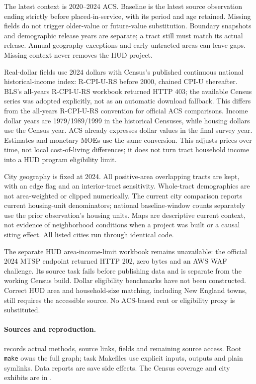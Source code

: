 \documentclass[11pt]{article}
\begin{document}
The latest context is 2020--2024 ACS. Baseline is the latest source observation
ending strictly before placed-in-service, with its period and age retained. Missing
fields do not trigger older-value or future-value substitution. Boundary snapshots
and demographic release years are separate; a tract still must match its actual
release. Annual geography exceptions and early untracted areas can leave gaps.
Missing context never removes the HUD project.

Real-dollar fields use 2024 dollars with Census's published continuous national
historical-income index: R-CPI-U-RS before 2000, chained CPI-U thereafter. BLS's
all-years R-CPI-U-RS workbook returned HTTP 403; the available Census series was
adopted explicitly, not as an automatic download fallback. This differs from the
all-years R-CPI-U-RS convention for official ACS comparisons. Income dollar years
are 1979/1989/1999 in the historical Censuses, while housing dollars use the Census
year. ACS already expresses dollar values in the final survey year. Estimates and
monetary MOEs use the same conversion. This adjusts prices over time, not local
cost-of-living differences; it does not turn tract household income into a HUD
program eligibility limit.

\clearpage


City geography is fixed at 2024. All positive-area overlapping tracts are kept,
with an edge flag and an interior-tract sensitivity. Whole-tract demographics are
not area-weighted or clipped numerically. The current city comparison reports
current housing-unit denominators; national baseline-window counts separately
use the prior observation's housing units. Maps are descriptive current context,
not evidence of neighborhood conditions when a project was built or a causal
siting effect. All listed cities run through identical code.

The separate HUD area-income-limit workbook remains unavailable: the official
2024 MTSP endpoint returned HTTP 202, zero bytes and an AWS WAF challenge. Its
source task fails before publishing data and is separate from the working Census
build. Dollar eligibility benchmarks have not been constructed. Correct HUD area
and household-size matching, including New England towns, still requires the
accessible source. No ACS-based rent or eligibility proxy is substituted.

\paragraph{Sources and reproduction.}  records actual methods,
source links, fields and remaining source access. Root \texttt{make} owns the full
graph; task Makefiles use explicit inputs, outputs and plain symlinks. Data reports
are save side effects. The Census coverage and city exhibits are in
.
\end{document}
